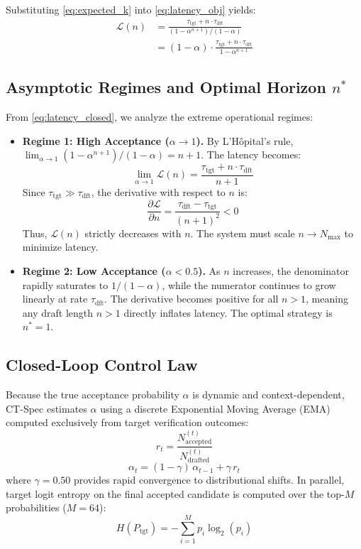 \documentclass[journal,10pt,twocolumn]{IEEEtran}
\newcommand{\ttg}{\mathrm{tgt}}
\newcommand{\dft}{\mathrm{dft}}
\newcommand{\ctspec}{\mbox{CT-Spec}}
\begin{document}
Substituting \eqref{eq:expected_k} into \eqref{eq:latency_obj} yields:
\begin{equation}
\begin{split}
\mathcal{L}(n) &= \frac{\tau_{\ttg} + n \cdot \tau_{\dft}}{(1 - \alpha^{n+1})/(1 - \alpha)} \\
&= (1 - \alpha) \cdot \frac{\tau_{\ttg} + n \cdot \tau_{\dft}}{1 - \alpha^{n+1}}
\end{split}
\label{eq:latency_closed}
\end{equation}

\subsection{Asymptotic Regimes and Optimal Horizon $n^*$}
From \eqref{eq:latency_closed}, we analyze the extreme operational regimes:
\begin{itemize}
    \item \textbf{Regime 1: High Acceptance ($\alpha \to 1$).} By L'H\^{o}pital's rule, $\lim_{\alpha \to 1} (1 - \alpha^{n+1})/(1 - \alpha) = n + 1$. The latency becomes:
    \begin{equation}
    \lim_{\alpha \to 1} \mathcal{L}(n) = \frac{\tau_{\ttg} + n \cdot \tau_{\dft}}{n + 1}
    \end{equation}
    Since $\tau_{\ttg} \gg \tau_{\dft}$, the derivative with respect to $n$ is:
    \begin{equation}
    \frac{\partial \mathcal{L}}{\partial n} = \frac{\tau_{\dft} - \tau_{\ttg}}{(n + 1)^2} < 0
    \end{equation}
    Thus, $\mathcal{L}(n)$ strictly decreases with $n$. The system must scale $n \to N_{\max}$ to minimize latency.
    \item \textbf{Regime 2: Low Acceptance ($\alpha < 0.5$).} As $n$ increases, the denominator rapidly saturates to $1/(1 - \alpha)$, while the numerator continues to grow linearly at rate $\tau_{\dft}$. The derivative becomes positive for all $n > 1$, meaning any draft length $n > 1$ directly inflates latency. The optimal strategy is $n^* = 1$.
\end{itemize}

\subsection{Closed-Loop Control Law}
Because the true acceptance probability $\alpha$ is dynamic and context-dependent, \ctspec{} estimates $\alpha$ using a discrete Exponential Moving Average (EMA) computed exclusively from target verification outcomes:
\begin{equation}
r_t = \frac{N_{\mathrm{accepted}}^{(t)}}{N_{\mathrm{drafted}}^{(t)}}
\end{equation}
\begin{equation}
\alpha_t = (1 - \gamma)\,\alpha_{t-1} + \gamma\,r_t
\end{equation}
where $\gamma = 0.50$ provides rapid convergence to distributional shifts. In parallel, target logit entropy on the final accepted candidate is computed over the top-$M$ probabilities ($M=64$):
\begin{equation}
H(P_{\mathrm{tgt}}) = - \sum_{i=1}^M p_i \log_2(p_i)
\end{equation}
\end{document}
